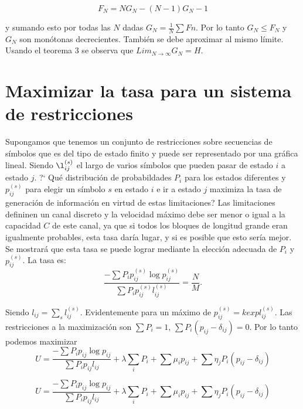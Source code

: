 \begin{appendices}
\begin{equation}
F_{N} = NG_{N}-(N-1)G_{N}-1
\end{equation}

y sumando esto por todas las $N$ dadas $G_{N}=\frac{1}{N}\sum F{n}$. Por lo tanto 
$G_{N}\leq F_{N}$ y $G_{N}$ son monótonas decrecientes. Tambi\'en se debe aproximar al mismo 
l\'imite. Usando el teorema 3 se observa que $Lim_{N\rightarrow \infty } G_{N} = H$.

\clearpage

\chapter{Maximizar la tasa para un sistema de restricciones}

Supongamos que tenemos un conjunto de restricciones sobre secuencias
de s\'imbolos que es del tipo de estado finito y puede ser
representado por una gr\'afica lineal. Siendo $\l_{ij}^{(s)}$ el largo
de varios s\'imbolos que pueden pasar de estado $i$ a estado $j$.  ?`
Qu\'e distribuci\'on de probabildades $P_{i}$ para los estados
diferentes y $p_{ij}^{(s)}$ para elegir un s\'imbolo $s$ en estado $i$
e ir a estado $j$ maximiza la tasa de generaci\'on de informaci\'on en
virtud de estas limitaciones? Las limitaciones defininen un canal
discreto y la velocidad m\'aximo debe ser menor o igual a la capacidad
$C$ de este canal, ya que si todos los bloques de longitud grande eran
igualmente probables, esta tasa dar\'ia lugar, y si es posible que
esto ser\'ia mejor. Se mostrar\'a que esta tasa se puede lograr
mediante la elecci\'on adecuada de $P_{i}$ y $p_{ij}^{(s)}$.  La tasa
es:
\begin{equation}
\frac{-\sum P_{i}p_{ij}^{(s)}\log p_{ij}^{(s)}}{\sum P_{i}p_{ij}^{(s)}l _{ij}^{(s)}} = \frac{N}{M}.
\end{equation}

Siendo $l_{ij}=\sum_{s}l _{ij}^{(s)}$. Evidentemente para un m\'aximo de 
$p_{ij}^{(s)}=k exp l_{ij}^{(s)}$. Las restricciones a la maximizaci\'on son 
$\sum P_{i} = 1$, $\sum P_{i}(p_{ij}-\delta_{ij})=0$. Por lo tanto podemos maximizar 
\begin{equation}
U=\frac{-\sum P_{i}p_{ij}\log p_{ij}}{\sum P_{i}p_{ij}l_{ij}}+\lambda \sum _{i}P_{i}+\sum\mu _{i}p_{ij}+\sum\eta _{j}P_{i}(p_{ij}-\delta_{ij})
\end{equation}

\begin{equation}
U=\frac{-\sum P_{i}p_{ij}\log p_{ij}}{\sum P_{i}p_{ij}l_{ij}}+\lambda \sum _{i}P_{i}+\sum\mu _{i}p_{ij}+\sum\eta _{j}P_{i}(p_{ij}-\delta_{ij})
\end{equation}


\end{appendices}
